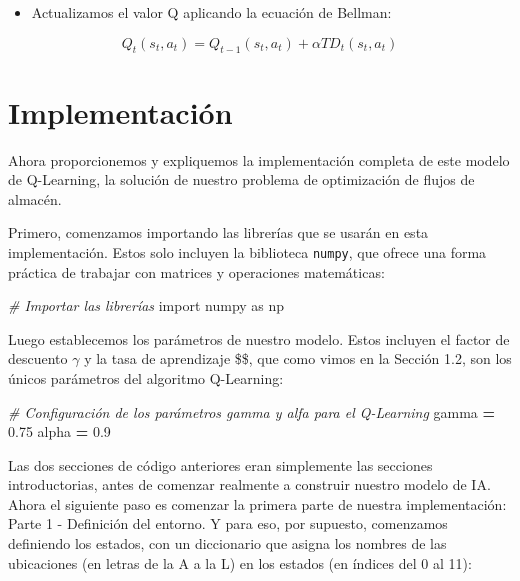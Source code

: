 \documentclass[]{book}
\newenvironment{Shaded}{\begin{snugshade}}{\end{snugshade}}
\newcommand{\CommentTok}[1]{\textcolor[rgb]{0.56,0.35,0.01}{\textit{#1}}}
\newcommand{\FloatTok}[1]{\textcolor[rgb]{0.00,0.00,0.81}{#1}}
\newcommand{\ImportTok}[1]{#1}
\newcommand{\NormalTok}[1]{#1}
\newcommand{\OperatorTok}[1]{\textcolor[rgb]{0.81,0.36,0.00}{\textbf{#1}}}
\providecommand{\tightlist}{%
  \setlength{\itemsep}{0pt}\setlength{\parskip}{0pt}}
\begin{document}
\begin{itemize}
\tightlist
\item
  Actualizamos el valor Q aplicando la ecuación de Bellman:
\end{itemize}

\[Q_t(s_t,a_t) = Q_{t-1}(s_t,a_t) + \alpha TD_t(s_t,a_t)\]

\hypertarget{implementaciuxf3n}{%
\section{Implementación}\label{implementaciuxf3n}}

Ahora proporcionemos y expliquemos la implementación completa de este modelo de Q-Learning, la solución de nuestro problema de optimización de flujos de almacén.

Primero, comenzamos importando las librerías que se usarán en esta implementación. Estos solo incluyen la biblioteca \texttt{numpy}, que ofrece una forma práctica de trabajar con matrices y operaciones matemáticas:

\begin{Shaded}
\begin{Highlighting}[]
\CommentTok{# Importar las librerías}
\ImportTok{import}\NormalTok{ numpy }\ImportTok{as}\NormalTok{ np}
\end{Highlighting}
\end{Shaded}

Luego establecemos los parámetros de nuestro modelo. Estos incluyen el factor de descuento \(\gamma\) y la tasa de aprendizaje \$\alpha \$, que como vimos en la Sección 1.2, son los únicos parámetros del algoritmo Q-Learning:

\begin{Shaded}
\begin{Highlighting}[]
\CommentTok{# Configuración de los parámetros gamma y alfa para el Q-Learning}
\NormalTok{gamma }\OperatorTok{=} \FloatTok{0.75}
\NormalTok{alpha }\OperatorTok{=} \FloatTok{0.9}
\end{Highlighting}
\end{Shaded}

Las dos secciones de código anteriores eran simplemente las secciones introductorias, antes de comenzar realmente a construir nuestro modelo de IA. Ahora el siguiente paso es comenzar la primera parte de nuestra implementación: Parte 1 - Definición del entorno. Y para eso, por supuesto, comenzamos definiendo los estados, con un diccionario que asigna los nombres de las ubicaciones (en letras de la A a la L) en los estados (en índices del 0 al 11):
\end{document}
